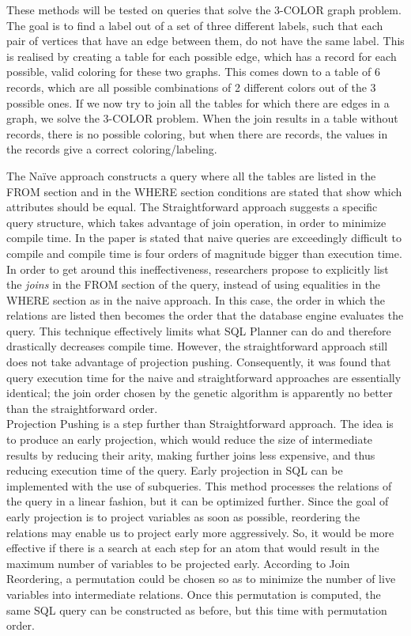 These methods will be tested on queries that solve the 3-COLOR graph problem. The goal is to find a label out of a set of three different labels, such that each pair of vertices that have an edge between them, do not have the same label. This is realised by creating a table for each possible edge, which has a record for each possible, valid coloring for these two graphs. This comes down to a table of 6 records, which are all possible combinations of 2 different colors out of the 3 possible ones. If we now try to join all the tables for which there are edges in a graph, we solve the 3-COLOR problem. When the join results in a table without records, there is no possible coloring, but when there are records, the values in the records give a correct coloring/labeling.

The Na\"ive approach constructs a query where all the tables are listed in the FROM section and in the WHERE section conditions are stated that show which attributes should be equal. The Straightforward approach suggests a specific query structure, which takes advantage of join operation, in order to minimize compile time. In the paper is stated that naive queries are exceedingly difficult to compile and compile time is four orders of magnitude bigger than execution time. In order to get around this ineffectiveness, researchers propose to explicitly list the \textit{joins} in the FROM section of the query, instead of using equalities in the WHERE section as in the naive approach. In this case, the order in which the relations are listed then becomes the order that the database engine evaluates the query. This technique effectively limits what SQL Planner can do and therefore drastically decreases compile time. However, the straightforward approach still does not take advantage of projection pushing. Consequently, it was found that query execution time for the naive and straightforward approaches are essentially identical; the join order chosen by the genetic algorithm is apparently no better than the straightforward order. \\

Projection Pushing is a step further than Straightforward approach. The idea is to produce an early projection, which would reduce the size of intermediate results by reducing their arity, making further joins less expensive, and thus reducing execution time of the query. Early projection in SQL can be implemented with the use of subqueries. This method processes the relations of the query in a linear fashion, but it can be optimized further. Since the goal of early projection is to project variables as soon as possible, reordering the relations may enable us to project early more aggressively. So, it would be more effective if there is a search at each step for an atom that would result in the maximum number of variables to be projected early. According to Join Reordering, a permutation could be chosen so as to minimize the number of live variables into intermediate relations. Once this permutation is computed, the same SQL query can be constructed as before, but this time with permutation order. \\